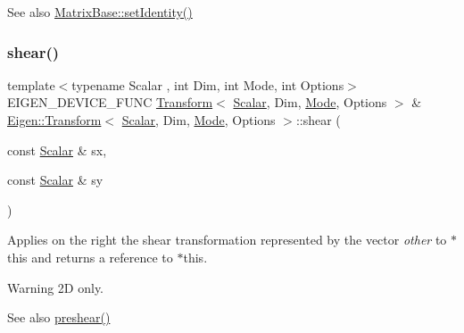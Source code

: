 \begin{DoxySeeAlso}{See also}
\mbox{\hyperlink{class_eigen_1_1_matrix_base_ae05be7fcc1ade707f0b73eb5f9d8cf33}{Matrix\+Base\+::set\+Identity()}} 
\end{DoxySeeAlso}
\mbox{\label{class_eigen_1_1_transform_a2999a84269a4a08d3af8a3ad1b0598ef}} 
\subsubsection{\texorpdfstring{shear()}{shear()}}
{\footnotesize\ttfamily template$<$typename Scalar , int Dim, int Mode, int Options$>$ \\
E\+I\+G\+E\+N\+\_\+\+D\+E\+V\+I\+C\+E\+\_\+\+F\+U\+NC \mbox{\hyperlink{class_eigen_1_1_transform}{Transform}}$<$ \mbox{\hyperlink{class_eigen_1_1_transform_a4e69ced9d651745b8ed4eda46f41795d}{Scalar}}, Dim, \mbox{\hyperlink{struct_mode}{Mode}}, Options $>$ \& \mbox{\hyperlink{class_eigen_1_1_transform}{Eigen\+::\+Transform}}$<$ \mbox{\hyperlink{class_eigen_1_1_transform_a4e69ced9d651745b8ed4eda46f41795d}{Scalar}}, Dim, \mbox{\hyperlink{struct_mode}{Mode}}, Options $>$\+::shear (\begin{DoxyParamCaption}\item[{const \mbox{\hyperlink{class_eigen_1_1_transform_a4e69ced9d651745b8ed4eda46f41795d}{Scalar}} \&}]{sx,  }\item[{const \mbox{\hyperlink{class_eigen_1_1_transform_a4e69ced9d651745b8ed4eda46f41795d}{Scalar}} \&}]{sy }\end{DoxyParamCaption})}

Applies on the right the shear transformation represented by the vector {\itshape other} to {\ttfamily $\ast$this} and returns a reference to {\ttfamily $\ast$this}. \begin{DoxyWarning}{Warning}
2D only. 
\end{DoxyWarning}
\begin{DoxySeeAlso}{See also}
\mbox{\hyperlink{class_eigen_1_1_transform_a2540957bb590f16260689bcf32d28a7a}{preshear()}} 
\end{DoxySeeAlso}
\mbox{\label{class_eigen_1_1_transform_a2afd15b4e0800382ba743703e16e025b}} 
